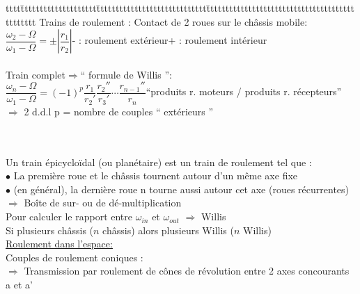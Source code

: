 \begin{bluebox}
\begin{tabbing}
tttt\=tttttttttttttttttttt\=ttttttttttttttttttttttttttttt\=ttttttttttttttttttttttttttttttttttttttttttttttt\kill
Trains de roulement : Contact de 2 roues sur le châssis mobile:\\
$\dfrac{\omega_2-\Omega}{\omega_1-\Omega} = \pm \left|\dfrac{r_1}{r_2}\right|$\>\>- : roulement extérieur\>+ : roulement intérieur\\\\
Train complet$\Rightarrow$“ {\color{orange}formule de Willis} ”:\\
$\dfrac{\omega_n-\Omega}{\omega_1-\Omega} = (-1)^p\dfrac{r_1}{r_2'}\dfrac{r_2''}{r_3'}\cdots\dfrac{r_{n-1}''}{r_n}$\>\>\>“produits r. moteurs / produits r. récepteurs”\\
$\Rightarrow$ 2 d.d.l\>\>\> p = nombre de couples “ extérieurs ” 
\end{tabbing}
\end{bluebox}\\\\

Un train {\color{orange}épicycloïdal} (ou planétaire) est un train de roulement tel que :\\
$\bullet$ La première roue et le châssis tournent autour d’un même axe fixe\\
$\bullet$ (en général), la dernière roue n tourne aussi autour cet axe (roues récurrentes)\\
$\Rightarrow$ Boîte de sur- ou de dé-multiplication\\

Pour calculer le rapport entre $\omega_{in}$ et $\omega_{out}$ $\Rightarrow$ {\color{orange}Willis}\\
Si plusieurs châssis ($n$ châssis) alors plusieurs Willis ($n$ Willis)\\

\underline{Roulement dans l’espace:}\\
Couples de roulement {\color{orange}coniques} :\\
$\Rightarrow$ Transmission par roulement de cônes de révolution entre 2 axes concourants a et a’\\


